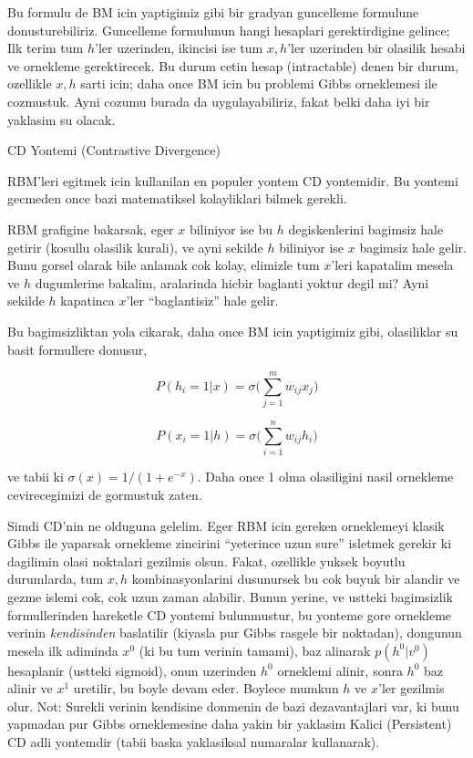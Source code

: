 \documentclass[12pt,fleqn]{article}\usepackage{../common}
\begin{document}
Bu formulu de BM icin yaptigimiz gibi bir gradyan guncelleme formulune
donusturebiliriz. Guncelleme formulunun hangi hesaplari gerektirdigine
gelince; Ilk terim tum $h$'ler uzerinden, ikincisi ise tum $x,h$'ler
uzerinden bir olasilik hesabi ve ornekleme gerektirecek. Bu durum cetin
hesap (intractable) denen bir durum, ozellikle $x,h$ sarti icin; daha once
BM icin bu problemi Gibbs orneklemesi ile cozmustuk. Ayni cozumu burada da
uygulayabiliriz, fakat belki daha iyi bir yaklasim su olacak.

CD Yontemi (Contrastive Divergence) 

RBM'leri egitmek icin kullanilan en populer yontem CD yontemidir. Bu
yontemi gecmeden once bazi matematiksel kolayliklari bilmek gerekli. 

RBM grafigine bakarsak, eger $x$ biliniyor ise bu $h$ degiskenlerini
bagimsiz hale getirir (kosullu olasilik kurali), ve ayni sekilde $h$
biliniyor ise $x$ bagimsiz hale gelir. Bunu gorsel olarak bile anlamak cok
kolay, elimizle tum $x$'leri kapatalim mesela ve $h$ dugumlerine bakalim,
aralarinda hicbir baglanti yoktur degil mi? Ayni sekilde $h$ kapatinca
$x$'ler ``baglantisiz'' hale gelir. 

Bu bagimsizliktan yola cikarak, daha once BM icin yaptigimiz gibi,
olasiliklar su basit formullere donusur,

$$ P(h_i=1|x) = \sigma \bigg( \sum _{j=1}^{m} w_{ij} x_j \bigg) $$

$$ P(x_i=1|h) = \sigma \bigg( \sum _{i=1}^{n} w_{ij} h_i \bigg) $$

ve tabii ki $\sigma(x) = 1 / (1+e^{-x})$. Daha once 1 olma olasiligini
nasil ornekleme cevirecegimizi de gormustuk zaten. 

Simdi CD'nin ne olduguna gelelim. Eger RBM icin gereken orneklemeyi klasik
Gibbs ile yaparsak ornekleme zincirini ``yeterince uzun sure'' isletmek
gerekir ki dagilimin olasi noktalari gezilmis olsun. Fakat, ozellikle
yuksek boyutlu durumlarda, tum $x,h$ kombinasyonlarini dusunursek bu cok
buyuk bir alandir ve gezme islemi cok, cok uzun zaman alabilir. Bunun
yerine, ve ustteki bagimsizlik formullerinden hareketle CD yontemi
bulunmustur, bu yonteme gore ornekleme verinin {\em kendisinden} baslatilir
(kiyasla pur Gibbs rasgele bir noktadan), dongunun mesela ilk adiminda
$x^0$ (ki bu tum verinin tamami), baz alinarak $p(h^0|v^0)$ hesaplanir
(ustteki sigmoid), onun uzerinden $h^0$ orneklemi alinir, sonra $h^0$ baz
alinir ve $x^1$ uretilir, bu boyle devam eder. Boylece mumkun $h$ ve
$x$'ler gezilmis olur. Not: Surekli verinin kendisine donmenin de bazi
dezavantajlari var, ki bunu yapmadan pur Gibbs orneklemesine daha yakin bir
yaklasim Kalici (Persistent) CD adli yontemdir (tabii baska yaklasiksal
numaralar kullanarak).
\end{document}
